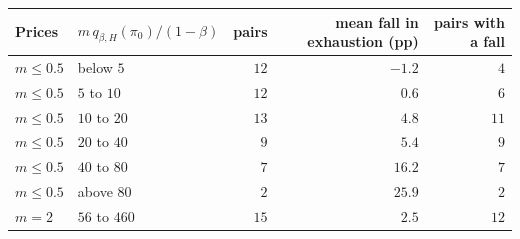 \begin{tabular}{llrrr}
\toprule
Prices & $m\,q_{\beta,H}(\pi_0)/(1-\beta)$ & pairs & mean fall in exhaustion (pp) & pairs with a fall \\
\midrule
$m\le0.5$ & below $5$ & $12$ & $-1.2$ & $4$ \\
$m\le0.5$ & $5$ to $10$ & $12$ & $0.6$ & $6$ \\
$m\le0.5$ & $10$ to $20$ & $13$ & $4.8$ & $11$ \\
$m\le0.5$ & $20$ to $40$ & $9$ & $5.4$ & $9$ \\
$m\le0.5$ & $40$ to $80$ & $7$ & $16.2$ & $7$ \\
$m\le0.5$ & above $80$ & $2$ & $25.9$ & $2$ \\
$m=2$ & $56$ to $460$ & $15$ & $2.5$ & $12$ \\
\bottomrule
\end{tabular}
